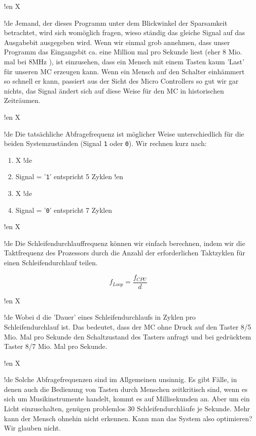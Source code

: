 !en X

!de Jemand, der dieses Programm unter dem Blickwinkel der Sparsamkeit betrachtet, wird sich womöglich fragen, wieso ständig das gleiche Signal auf das Ausgabebit ausgegeben wird. Wenn wir einmal grob annehmen, dass unser Programm das Eingangsbit ca. eine Million mal pro Sekunde liest (eher 8 Mio. mal bei 8MHz ), ist einzusehen, dass ein Mensch mit einem Tasten kaum 'Last' für unseren MC erzeugen kann. Wenn ein Mensch auf den Schalter einhämmert so schnell er kann, passiert aus der Sicht des Micro Controllers so gut wir gar nichts, das Signal ändert sich auf diese Weise für den MC in historischen Zeiträumen.


!en X

!de Die tatsächliche Abfragefrequenz ist möglicher Weise unterschiedlich für die beiden Systemzuständen (Signal \texttt{1} oder \texttt{0}). Wir rechnen kurz nach:

\begin{enumerate}
!en   \item X
!de   \item Signal = '\texttt{1}' entspricht 5 Zyklen
!en   \item X
!de   \item Signal = '\texttt{0}' entspricht 7 Zyklen
\end{enumerate}



!en X

!de Die Schleifendurchlauffrequenz können wir einfach berechnen, indem wir die Taktfrequenz des Prozessors durch die Anzahl der erforderlichen Taktzyklen für einen Schleifendurchlauf teilen.

\begin{equation}
f_{Loop} = \frac{f_{CPU}}{d}
\end{equation}

!en X

!de Wobei d die 'Dauer' eines Schleifendurchlaufs in Zyklen pro Schleifendurchlauf ist. Das bedeutet, dass der MC ohne Druck auf den Taster 8/5 Mio. Mal pro Sekunde den Schaltzustand des Tasters anfragt und bei gedrücktem Taster 8/7 Mio. Mal pro Sekunde.


!en X

!de Solche Abfragefrequenzen sind im Allgemeinen unsinnig. Es gibt Fälle, in denen auch die Bedienung von Tasten durch Menschen zeitkritisch sind, wenn es sich um Musikinstrumente handelt, kommt es auf Millisekunden an. Aber um ein Licht einzuschalten, genügen problemlos 30 Schleifendurchläufe je Sekunde. Mehr kann der Mensch ohnehin nicht erkennen. Kann man das System also optimieren? Wir glauben nicht.




